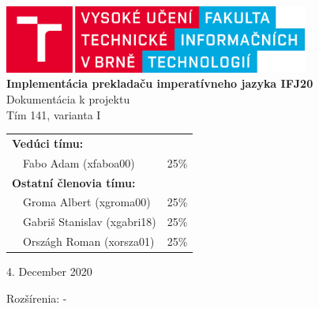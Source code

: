 \documentclass[a4paper,11pt]{article}
\begin{document}
	
	\begin{titlepage}
		\begin{center}
			\includegraphics[width = 10cm]{logo_cz.png}\\
			\LARGE{\bfseries Implementácia prekladaču imperatívneho jazyka IFJ20}\\[2mm]
			\LARGE{Dokumentácia k projektu}\\[5mm]
			\Large{ Tím 141, varianta I}\\
			\begin{table}[h]
				\begin{center}
					\Large
					\begin{tabular}{lll}
						\multicolumn{2}{l}{\bfseries Vedúci tímu:} & \\[1mm]
						\hspace{5mm} & Fabo Adam  (xfaboa00) & 25\% \\[1mm]
						\multicolumn{2}{l}{\bfseries Ostatní členovia tímu:} & \\[1mm]
						\hspace{5mm} & Groma Albert  (xgroma00) & 25\% \\[1mm]
						\hspace{5mm} & Gabriš Stanislav (xgabri18) & 25\% \\[1mm]
						\hspace{5mm} & Országh Roman  (xorsza01) & 25\% \\[1mm]
					\end{tabular}
				\end{center}
			\end{table}
		\end{center}
		\begin{minipage}{.45\linewidth}
			\begin{flushleft}
  				{\Large 4. December 2020}
			\end{flushleft}
		\end{minipage}
		\begin{minipage}{.45\linewidth}
    		\begin{flushright}
      			{\Large Rozšírenia: \hspace{5mm} - \hspace{5mm}}
    		\end{flushright} 
  		\end{minipage}
	\end{titlepage}
\end{document}
